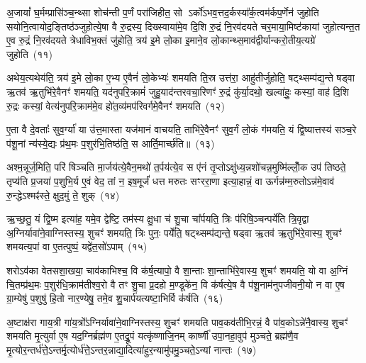 अ॒जायां᳚ घ॒र्मम्प्रासि॑ञ्च॒न्थ्सा शोच॑न्ती प॒र्णं परा॑जिहीत॒ सो \-ऽर्को॑\-ऽभव॒त्तद॒र्कस्या᳚र्क॒त्वम॑र्कप॒र्णेन॑ जुहोति सयोनि॒त्वायोद॒ङ्तिष्ठ॑ञ्जुहोत्ये॒षा वै रु॒द्रस्य॒ दिख्स्वाया॑मे॒व दि॒शि रु॒द्रं नि॒रव॑दयते चर॒माया॒मिष्ट॑कायां जुहोत्यन्त॒त ए॒व रु॒द्रं नि॒रव॑दयते त्रेधाविभ॒क्तं जु॑होति॒ त्रय॑ इ॒मे लो॒का इ॒माने॒व लो॒कान्थ्स॒माव॑द्वीर्यान्करो॒तीय॒त्यग्रे॑ जुहोति~(११)

अथेय॒त्यथेय॑ति॒ त्रय॑ इ॒मे लो॒का ए॒भ्य ए॒वैनं॑ लो॒केभ्यः॑ शमयति ति॒स्र उत्त॑रा॒ आहु॑तीर्जुहोति॒ षट्थ्सम्प॑द्य॒न्ते षड्वा ऋ॒तव॑ ऋ॒तुभि॑रे॒वैनꣳ॑ शमयति॒ यद॑नुपरि॒क्रामं॑ जुहु॒याद॑न्तरवचा॒रिणꣳ॑ रु॒द्रं कु॑र्या॒दथो॒ खल्वा॑हुः॒ कस्यां॒ वाह॑ दि॒शि रु॒द्रः कस्यां॒ वेत्य॑नुपरि॒क्राम॑मे॒व हो॑त॒व्य॑मप॑रिवर्गमे॒वैनꣳ॑ शमयति~(१२)

ए॒ता वै दे॒वताः᳚ सुव॒र्ग्या॑ या उ॑त्त॒मास्ता यज॑मानं वाचयति॒ ताभि॑रे॒वैनꣳ॑ सुव॒र्गं लो॒कं ग॑मयति॒ यं द्वि॒ष्यात्तस्य॑ सञ्च॒रे प॑शू॒नां न्य॑स्ये॒द्यः प्र॑थ॒मः प॒शुर॑भि॒तिष्ठ॑ति॒ स आर्ति॒मार्च्छ॑ति॥~(१३)

{\anuvakamend[{प॒शू॒नां यन्तो\-ऽग्रे॑ जुहो॒त्यप॑रिवर्गमे॒वैनꣳ॑ शमयति त्रि॒ꣳ॒शच्च॑}]}%

अश्म॒न्नूर्ज॒मिति॒ परि॑ षिञ्चति मा॒र्जय॑त्ये॒वैन॒मथो॑ त॒र्पय॑त्ये॒व स ए॑नं तृ॒प्तो\-ऽक्षु॑ध्य॒न्नशो॑चन्न॒मुष्मि॑ल्लोँ॒क उप॑ तिष्ठते॒ तृप्य॑ति प्र॒जया॑ प॒शुभि॒र्य ए॒वं वेद॒ तां न॒ इष॒मूर्जं॑ धत्त मरुतः सꣳररा॒णा इत्या॒हान्नं॒ वा ऊर्गन्न॑म्म॒रुतो\-ऽन्न॑मे॒वाव॑ रु॒न्द्धे\-ऽश्मꣴ॑स्ते॒ क्षुद॒मुं ते॒ शुक्~(१४)

ऋ॒च्छ॒तु॒ यं द्वि॒ष्म इत्या॑ह॒ यमे॒व द्वेष्टि॒ तम॑स्य क्षु॒धा च॑ शु॒चा चा᳚र्पयति॒ त्रिः प॑रिषि॒ञ्चन्पर्ये॑ति त्रि॒वृद्वा अ॒ग्निर्यावा॑ने॒वाग्निस्तस्य॒ शुचꣳ॑ शमयति॒ त्रिः पुनः॒ पर्ये॑ति॒ षट्थ्सम्प॑द्यन्ते॒ षड्वा ऋ॒तव॑ ऋ॒तुभि॑रे॒वास्य॒ शुचꣳ॑ शमयत्य॒पां वा ए॒तत्पुष्पं॒ यद्वे॑त॒सो॑\-ऽपाम्~(१५)

शरो\-ऽव॑का वेतसशा॒खया॒ चाव॑काभिश्च॒ वि क॑र्\mbox{}ष॒त्यापो॒ वै शा॒न्ताः शा॒न्ताभि॑रे॒वास्य॒ शुचꣳ॑ शमयति॒ यो वा अ॒ग्निं चि॒तम्प्र॑थ॒मः प॒शुर॑धि॒क्राम॑तीश्व॒रो वै तꣳ शु॒चा प्र॒दहो म॒ण्डूके॑न॒ वि क॑र्\mbox{}षत्ये॒ष वै प॑शू॒नाम॑नुपजीवनी॒यो न वा ए॒ष ग्रा॒म्येषु॑ प॒शुषु॑ हि॒तो नार॒ण्येषु॒ तमे॒व शु॒चार्प॑यत्यष्टा॒भिर्वि क॑र्\mbox{}षति~(१६)

अ॒ष्टाक्ष॑रा गाय॒त्री गा॑य॒त्रो᳚\-ऽग्निर्यावा॑ने॒वाग्निस्तस्य॒ शुचꣳ॑ शमयति पाव॒कव॑तीभि॒रन्नं॒ वै पा॑व॒को\-ऽन्ने॑नै॒वास्य॒ शुचꣳ॑ शमयति मृ॒त्युर्वा ए॒ष यद॒ग्निर्ब्रह्म॑ण ए॒तद्रू॒पं यत्कृ॑ष्णाजि॒नम् कार्\mbox{}ष्णी॑ उपा॒नहा॒वुप॑ मुञ्चते॒ ब्रह्म॑णै॒व मृ॒त्योर॒न्तर्ध॑त्ते॒\-ऽन्तर्मृ॒त्योर्ध॑त्ते॒\-ऽन्तर॒न्नाद्या॒दित्या॑हुर॒न्यामु॑पमु॒ञ्चते॒\-ऽन्यां नान्तः~(१७)

